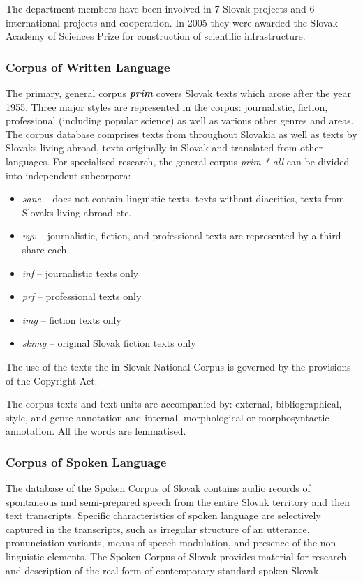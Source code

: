 \begin{multicols}{2}
The department
members have been involved in 7 Slovak projects and 6 international
projects and cooperation. In 2005 they were awarded the Slovak Academy
of Sciences Prize for construction of scientific infrastructure. 

\subsubsection{Corpus of Written Language}
The primary, general corpus {\bf\emph{prim}} covers Slovak texts
which arose after the year 1955. Three major styles are represented in the
corpus: journalistic, fiction, professional (including popular science) as well as
various other genres and areas. The corpus database comprises texts from
throughout Slovakia as well as texts by Slovaks living abroad, texts originally
in Slovak and translated from other languages. For specialised research, the
general corpus \emph{prim-*-all} can be divided into independent subcorpora:

\begin{itemize}
\item \emph{sane} – does not contain linguistic texts, texts without diacritics, texts from Slovaks living abroad etc.
\item \emph{vyv} – journalistic, fiction, and professional texts are represented by a third share each
\item \emph{inf} – journalistic texts only
\item \emph{prf} – professional texts only
\item \emph{img} – fiction texts only
\item \emph{skimg} – original Slovak fiction texts only
\end{itemize}

The use of the texts the in Slovak National Corpus is governed by the provisions of the Copyright Act.

The corpus texts and text units are accompanied by: external,
bibliographical, style, and genre
annotation\cite{f12} and internal,
morphological or morphosyntactic
annotation\cite{f13}. All the words
are lemmatised.

\subsubsection{Corpus of Spoken Language}
The database of the Spoken Corpus of
Slovak\cite{f14} contains audio records
of spontaneous and semi-prepared speech from the entire Slovak territory and
their text transcripts. Specific characteristics of spoken language are
selectively captured in the transcripts, such as irregular structure of an
utterance, pronunciation variants, means of speech modulation, and presence of
the non-linguistic elements. The Spoken Corpus of Slovak provides material for
research and description of the real form of contemporary standard spoken
Slovak.


\end{multicols}
